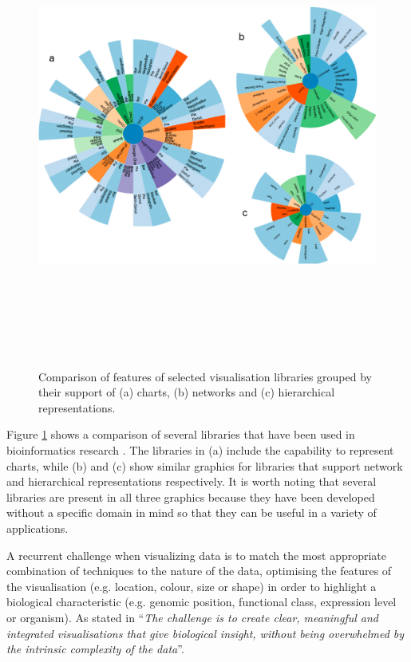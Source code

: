 \begin{figure}  
\includegraphics[height=6in,angle=90]{figures/vis_libs.png}
\caption[Comparison of features of selected visualisation libraries.]{Comparison of features of selected visualisation libraries grouped by their support of (a) charts, (b) networks and (c) hierarchical representations.
\label{fig:vis_libs}}
\end{figure}

Figure \ref{fig:vis_libs} shows a comparison of several libraries that have been used in bioinformatics research \cite{WAN2014}. The libraries in (a) include the capability to represent charts, while (b) and (c) show similar graphics for libraries that support network and hierarchical representations respectively. It is worth noting that several libraries are present in all three graphics because they have been developed without a specific domain in mind so that they can be useful in a variety of applications.
 
A recurrent challenge when visualizing data is to match the most appropriate combination of techniques to the nature of the data, optimising the features of the visualisation (e.g. location, colour, size or shape) in order to highlight a biological characteristic (e.g. genomic position, functional class, expression level or organism). As stated in \cite{GEH2010} ``\emph{The challenge is to create clear, meaningful and integrated visualisations that give biological insight, without being overwhelmed by the intrinsic complexity of the data}''.

